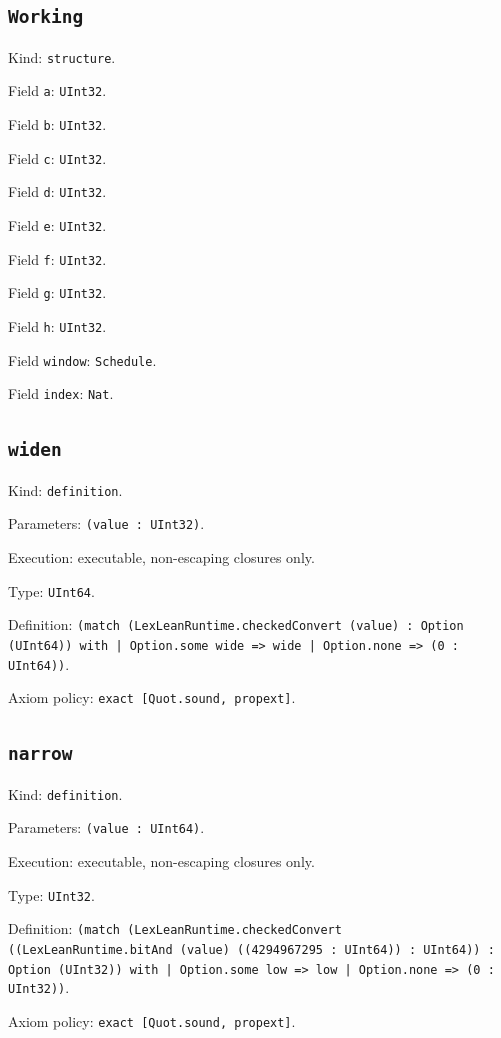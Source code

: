 \documentclass[11pt]{article}
\begin{document}
\subsection*{\texttt{Working}}
\noindent Kind: \texttt{structure}.\par
\noindent Field \texttt{a}: \texttt{UInt32}.\par
\noindent Field \texttt{b}: \texttt{UInt32}.\par
\noindent Field \texttt{c}: \texttt{UInt32}.\par
\noindent Field \texttt{d}: \texttt{UInt32}.\par
\noindent Field \texttt{e}: \texttt{UInt32}.\par
\noindent Field \texttt{f}: \texttt{UInt32}.\par
\noindent Field \texttt{g}: \texttt{UInt32}.\par
\noindent Field \texttt{h}: \texttt{UInt32}.\par
\noindent Field \texttt{window}: \texttt{Schedule}.\par
\noindent Field \texttt{index}: \texttt{Nat}.\par
\subsection*{\texttt{widen}}
\noindent Kind: \texttt{definition}.\par
\noindent Parameters: \texttt{(value : UInt32)}.\par
\noindent Execution: executable, non-escaping closures only.\par
\noindent Type: \texttt{UInt64}.\par
\noindent Definition: \texttt{(match (LexLeanRuntime.checkedConvert (value) : Option (UInt64)) with | Option.some wide => wide | Option.none => (0 : UInt64))}.\par
\noindent Axiom policy: \texttt{exact [Quot.sound, propext]}.\par
\subsection*{\texttt{narrow}}
\noindent Kind: \texttt{definition}.\par
\noindent Parameters: \texttt{(value : UInt64)}.\par
\noindent Execution: executable, non-escaping closures only.\par
\noindent Type: \texttt{UInt32}.\par
\noindent Definition: \texttt{(match (LexLeanRuntime.checkedConvert ((LexLeanRuntime.bitAnd (value) ((4294967295 : UInt64)) : UInt64)) : Option (UInt32)) with | Option.some low => low | Option.none => (0 : UInt32))}.\par
\noindent Axiom policy: \texttt{exact [Quot.sound, propext]}.\par
\end{document}
